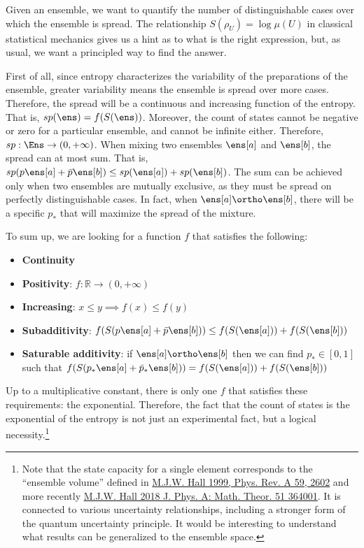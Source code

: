 Given an ensemble, we want to quantify the number of distinguishable cases over which the ensemble is spread. The relationship $S(\rho_U) = \log \mu(U)$ in classical statistical mechanics gives us a hint as to what is the right expression, but, as usual, we want a principled way to find the answer.

First of all, since entropy characterizes the variability of the preparations of the ensemble, greater variability means the ensemble is spread over more cases. Therefore, the spread will be a continuous and increasing function of the entropy. That is, $sp(\ens)=f(S(\ens))$. Moreover, the count of states cannot be negative or zero for a particular ensemble, and cannot be infinite either. Therefore, $sp : \Ens \to (0,+\infty)$. When mixing two ensembles $\ens[a]$ and $\ens[b]$, the spread can at most sum. That is, $sp(p\ens[a] + \bar{p} \ens[b]) \leq sp(\ens[a]) +sp(\ens[b])$. The sum can be achieved only when two ensembles are mutually exclusive, as they must be spread on perfectly distinguishable cases. In fact, when $\ens[a] \ortho \ens[b]$, there will be a specific $p_*$ that will maximize the spread of the mixture.

To sum up, we are looking for a function $f$ that satisfies the following:
\begin{itemize}
	\item \textbf{Continuity}
	\item \textbf{Positivity}: $f : \mathbb{R} \to (0,+\infty)$
	\item \textbf{Increasing}: $x \leq y \implies f(x) \leq f(y)$
	\item \textbf{Subadditivity}: $f(S(p\ens[a]+\bar{p}\ens[b])) \leq f(S(\ens[a])) + f(S(\ens[b]))$
	\item \textbf{Saturable additivity}: if $\ens[a] \ortho \ens[b]$ then we can find $p_* \in [0,1]$ such that $f(S(p_*\ens[a]+\bar{p}_*\ens[b])) = f(S(\ens[a])) + f(S(\ens[b]))$
\end{itemize} 
Up to a multiplicative constant, there is only one $f$ that satisfies these requirements: the exponential. Therefore, the fact that the count of states is the exponential of the entropy is not just an experimental fact, but a logical necessity.\footnote{Note that the state capacity for a single element corresponds to the ``ensemble volume'' defined in \href{https://journals.aps.org/pra/abstract/10.1103/PhysRevA.59.2602}{M.J.W. Hall 1999, Phys. Rev. A 59, 2602} and more recently \href{https://iopscience.iop.org/article/10.1088/1751-8121/aad50f}{M.J.W. Hall 2018 J. Phys. A: Math. Theor. 51 364001}. It is connected to various uncertainty relationships, including a stronger form of the quantum uncertainty principle. It would be interesting to understand what results can be generalized to the ensemble space.}

